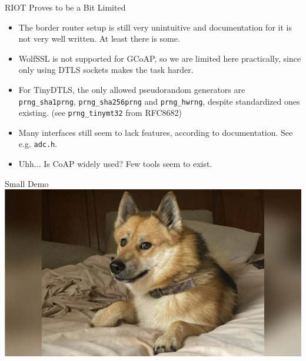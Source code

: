 \documentclass[10pt, xcolor=svgnames]{beamer}
\begin{document}
\begin{frame}{RIOT Proves to be a Bit Limited}
    \begin{itemize}
        \item The border router setup is still very unintuitive and documentation for it is not very well written. At least there is some.
        \item WolfSSL is not supported for GCoAP, so we are limited here practically, since only using DTLS sockets makes the task harder.
        \item For TinyDTLS, the only allowed pseudorandom generators are \texttt{prng\_sha1prng}, \texttt{prng\_sha256prng} and \texttt{prng\_hwrng}, despite standardized ones existing. (see \texttt{prng\_tinymt32} from RFC8682)
        \item Many interfaces still seem to lack features, according to documentation. See e.g. \texttt{adc.h}.
        \item Uhh... Is CoAP widely used? Few tools seem to exist.
    \end{itemize}
\end{frame}

\begin{frame}{Small Demo}
    \includegraphics[width=\linewidth]{doge2.jpg}
\end{frame}
\end{document}
